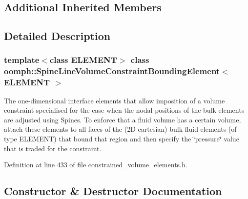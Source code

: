 \subsection*{Additional Inherited Members}


\subsection{Detailed Description}
\subsubsection*{template$<$class E\+L\+E\+M\+E\+NT$>$\newline
class oomph\+::\+Spine\+Line\+Volume\+Constraint\+Bounding\+Element$<$ E\+L\+E\+M\+E\+N\+T $>$}

The one-\/dimensional interface elements that allow imposition of a volume constraint specialised for the case when the nodal positions of the bulk elements are adjusted using Spines. To enforce that a fluid volume has a certain volume, attach these elements to all faces of the (2D cartesian) bulk fluid elements (of type E\+L\+E\+M\+E\+NT) that bound that region and then specify the \char`\"{}pressure\char`\"{} value that is traded for the constraint. 

Definition at line 433 of file constrained\+\_\+volume\+\_\+elements.\+h.



\subsection{Constructor \& Destructor Documentation}
\mbox{\label{classoomph_1_1SpineLineVolumeConstraintBoundingElement_a5b8bb4a60ee78615103eb6b9fa3eb397}} 
